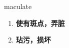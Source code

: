 
\begin{frame}
{\huge maculate}
\begin{center}
\begin{enumerate}\Large
  \item \textbf{使有斑点，弄脏}
  \item \textbf{玷污，损坏}
\end{enumerate}
\end{center}
\end{frame}
